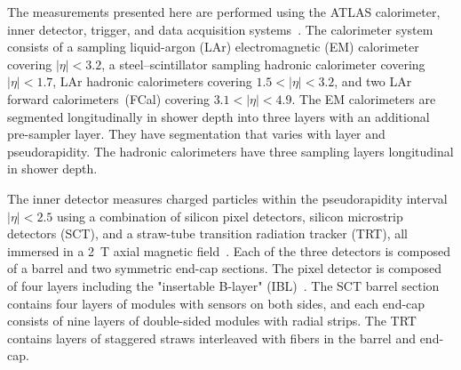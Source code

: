 
The measurements presented here are performed using the ATLAS calorimeter, inner detector, trigger,
and data acquisition systems~\cite{Aad:2008zzm}. 
The calorimeter system consists of a sampling liquid-argon (LAr) electromagnetic (EM) calorimeter covering $|\eta|<3.2$, a
steel--scintillator sampling hadronic calorimeter covering $|\eta| <1.7$, LAr hadronic calorimeters covering $1.5 < |\eta| < 3.2$, and
two LAr forward calorimeters~(FCal) covering $3.1 < |\eta| <
4.9$. 
The EM calorimeters are segmented longitudinally in shower depth into three
layers with an additional pre-sampler layer. They
have segmentation that varies with layer and pseudorapidity. 
The hadronic calorimeters have three sampling layers longitudinal
in shower depth.

The inner detector measures charged particles  within the pseudorapidity interval  $|\eta|<2.5$ using a combination of silicon pixel detectors, silicon microstrip detectors (SCT), and a straw-tube transition radiation tracker (TRT), all immersed in a 2~T axial magnetic field~\cite{Aad:2008zzm}. Each of the three detectors is composed of a barrel and two symmetric end-cap sections. The pixel detector is composed of four layers including the "insertable B-layer" (IBL)~\cite{ibl1,ibl2}. The SCT barrel section contains four layers of modules with sensors on both sides, and each end-cap consists of nine layers of double-sided modules with radial strips. The TRT contains layers of staggered straws interleaved with fibers in the barrel and end-cap.



